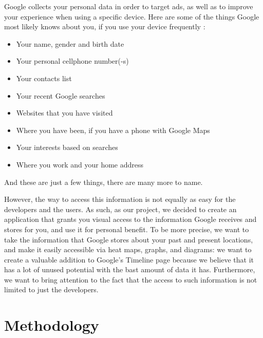 \documentclass[12p]{article}
\begin{document}
Google collects your personal data in order to target ads, as well as to improve your experience when using a specific device. Here are some of the things Google most likely knows about you, if you use your device frequently \cite{GooglePrivacyPolicy}:

\begin{itemize}
	\item Your name, gender and birth date
	\item Your personal cellphone number(-s)
	\item Your contacts list
	\item Your recent Google searches
	\item Websites that you have visited
	\item Where you have been, if you have a phone with Google Maps
	\item Your interests based on searches
	\item Where you work and your home address
\end{itemize}

And these are just a few things, there are many more to name.

However, the way to access this information is not equally as easy for the developers and the users. As such, as our project, we decided to create an application that grants you visual access to the information Google receives and stores for you, and use it for personal benefit. To be more precise, we want to take the information that Google stores about your past and present locations, and make it easily accessible via heat maps, graphs, and diagrams: we want to create a valuable addition to Google's Timeline page because we believe that it has a lot of unused potential with the bast amount of data it has. Furthermore, we want to bring attention to the fact that the access to such information is not limited to just the developers.


\clearpage
\section{Methodology} \label{Methodology}

\end{document}
